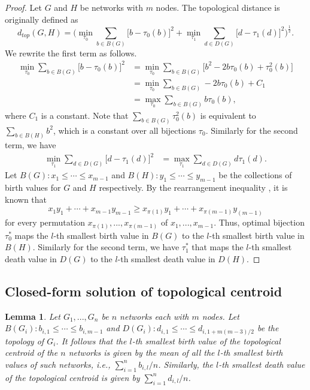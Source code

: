 \documentclass{article} %
\newtheorem{lemma}{Lemma}
\begin{document}
\begin{proof}
Let $G$ and $H$ be networks with $m$ nodes. The topological distance is originally defined as
\[ d_{top}(G,H) = \Big( \min_{\tau_0} \sum_{b \in B(G)} \big[ b - \tau_0(b)\big]^2 + \min_{\tau_1} \sum_{d \in D(G)} \big[ d - \tau_1(d)\big]^2 \Big)^{\frac{1}{2}} .\] 
We rewrite the first term as follows.
\begin{equation*}
    \begin{split}
        \min_{\tau_0} \sum_{b \in B(G)} \big[ b - \tau_0(b)\big]^2 &=  \min_{\tau_0} \sum_{b \in B(G)} \big[ b^2 - 2b\tau_0(b) + \tau_0^2(b) \big] \\
        &=  \min_{\tau_0} \sum_{b \in B(G)} - 2b\tau_0(b) + C_1 \\
        &=  \max_{\tau_0} \sum_{b \in B(G)} b\tau_0(b),
    \end{split}
\end{equation*}
where $C_1$ is a constant. Note that $\sum_{b \in B(G)}\tau_0^2(b)$ is equivalent to $\sum_{b \in B(H)}b^2$, which is a constant over all bijections $\tau_0$. Similarly for the second term, we have
\begin{equation*}
    \begin{split}
        \min_{\tau_1} \sum_{d \in D(G)} \big[ d - \tau_1(d)\big]^2
        &=  \max_{\tau_1} \sum_{d \in D(G)} d\tau_1(d).
    \end{split}
\end{equation*}
Let $B(G): x_1 \leq \cdots \leq x_{m-1}$ and $B(H): y_1 \leq \cdots \leq y_{m-1}$ be the collections of birth values for $G$ and $H$ respectively.
By the rearrangement inequality \citep{mitrinovic1970analytic}, it is known that 
\[x_1y_1 + \cdots + x_{m-1}y_{m-1} \geq x_{\pi(1)}y_1 + \cdots + x_{\pi(m-1)}y_{(m-1)}\]
for every permutation $x_{\pi(1)},...,x_{\pi(m-1)}$ of $x_1,...,x_{m-1}$. Thus, optimal bijection $\tau^*_0$ maps the $l$-th smallest birth value in $B(G)$ to the $l$-th smallest birth value in $B(H)$. Similarly for the second term, we have $\tau^*_1$ that maps the $l$-th smallest death value in $D(G)$ to the $l$-th smallest death value in $D(H)$.
\end{proof}


\subsection{Closed-form solution of topological centroid}
\begin{lemma}
\label{lem:topcentroid}
Let $G_1,...,G_n$ be $n$ networks each with $m$ nodes. 
Let $B(G_i): b_{i,1} \leq \cdots \leq b_{i,m-1}$ and $D(G_i): d_{i,1} \leq \cdots \leq d_{i,1+m(m-3)/2}$ be the topology of $G_i$.
It follows that the $l$-th smallest birth value of the topological centroid of the $n$ networks is given by the mean of all the $l$-th smallest birth values of such networks, i.e., 
$ \sum_{i=1}^n b_{i,l} / n $.
Similarly, the $l$-th smallest death value of the topological centroid is given by $\sum_{i=1}^n d_{i,l} / n$.
\end{lemma}
\end{document}
